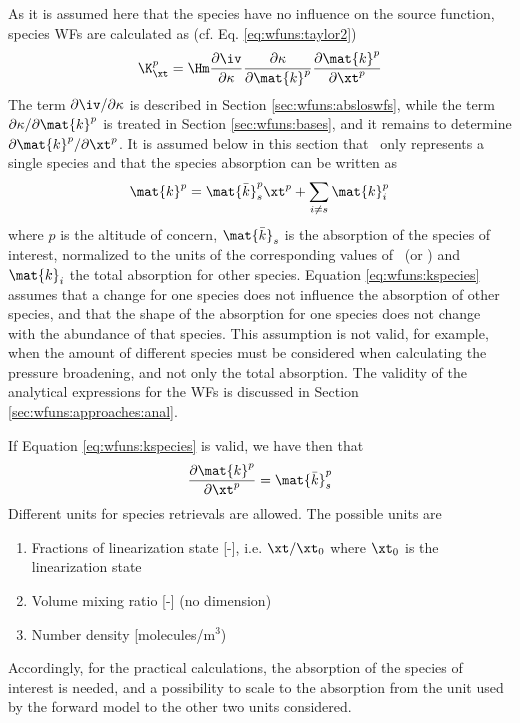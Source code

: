  As it is assumed here that the species have no influence on
 the source function, species WFs are calculated as (cf. Eq.
 \ref{eq:wfuns:taylor2})
 \begin{equation}
    \K_{\xt}^p = \Hm
                 \frac{\partial\iv}{\partial \kappa}
                 \frac{\partial \kappa}{\partial \mat{k}^p}
                 \frac{\partial \mat{k}^p}{\partial \xt^p}
  \label{eq:wfuns:species}
 \end{equation}
 The term $\partial\iv / \partial \kappa$ is described in Section
 \ref{sec:wfuns:absloswfs}, while the term $\partial \kappa /\partial
 \mat{k}^p$ is treated in Section \ref{sec:wfuns:bases}, and it
 remains to determine $\partial \mat{k}^p / \partial \xt^p$. It is
 assumed below in this section that \xt\ only represents a single 
 species and that the species absorption can be written as
 \begin{equation}
   \mat{k}^p = \mat{\bar{k}}^p_s \xt^p + \sum_{i\ne s} \mat{k}^p_i
  \label{eq:wfuns:kspecies}
 \end{equation}
 where $p$ is the altitude of concern, $\mat{\bar{k}}_s$ is the
 absorption of the species of interest, normalized to the units of the
 corresponding values of \xt\ (or \bt) and $\mat{k}_i$ the total
 absorption for other species. Equation \ref{eq:wfuns:kspecies}
 assumes that a change for one species does not influence the
 absorption of other species, and that the shape of the absorption for
 one species does not change with the abundance of that species.  This
 assumption is not valid, for example, when the amount of different
 species must be considered when calculating the pressure broadening,
 and not only the total absorption. The validity of the analytical
 expressions for the WFs is discussed in Section
 \ref{sec:wfuns:approaches:anal}.

 If Equation \ref{eq:wfuns:kspecies} is valid, we have then that
 \begin{equation}
   \frac{\partial \mat{k}^p}{\partial \xt^p} = \mat{\bar{k}}^p_s
  \label{eq:wfuns:dkspecies}
 \end{equation}
 Different units for species retrievals are allowed. The possible units are
 \begin{enumerate}
    \item Fractions of linearization state [-], i.e. $\xt/\xt_0$ where
          $\xt_0$ is the linearization state 
    \item Volume mixing ratio [-] (no dimension)
    \item Number density [molecules/m$^3$)
 \end{enumerate}
 Accordingly, for the practical calculations, the absorption of the
 species of interest is needed, and a possibility to scale to the
 absorption from the unit used by the forward model to the other two
 units considered.
 
